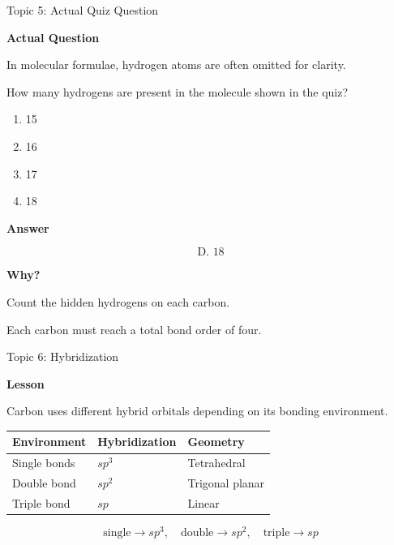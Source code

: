 \documentclass[aspectratio=169]{beamer}
\begin{document}
\begin{frame}[t]{Topic 5: Actual Quiz Question}
\scriptsize

\textbf{Actual Question}

In molecular formulae, hydrogen atoms are often omitted for clarity.

How many hydrogens are present in the molecule shown in the quiz?

\vspace{0.08cm}

\begin{enumerate}
    \setlength{\itemsep}{0.04cm}
    \item[A.] 15
    \item[B.] 16
    \item[C.] 17
    \item[D.] 18
\end{enumerate}

\vspace{0.08cm}

\textbf{Answer}

\[
\boxed{\text{D. }18}
\]

\vspace{-0.12cm}

\textbf{Why?}

Count the hidden hydrogens on each carbon.

Each carbon must reach a total bond order of four.

\end{frame}

\begin{frame}[t]{Topic 6: Hybridization}
\small

\textbf{Lesson}

Carbon uses different hybrid orbitals depending on its bonding environment.

\begin{center}
\renewcommand{\arraystretch}{1.25}
\begin{tabular}{lll}
\toprule
\textbf{Environment} & \textbf{Hybridization} & \textbf{Geometry} \\
\midrule
Single bonds & $sp^3$ & Tetrahedral \\
Double bond & $sp^2$ & Trigonal planar \\
Triple bond & $sp$ & Linear \\
\bottomrule
\end{tabular}
\end{center}

\[
\boxed{
\text{single} \rightarrow sp^3,\quad
\text{double} \rightarrow sp^2,\quad
\text{triple} \rightarrow sp
}
\]

\end{frame}
\end{document}

